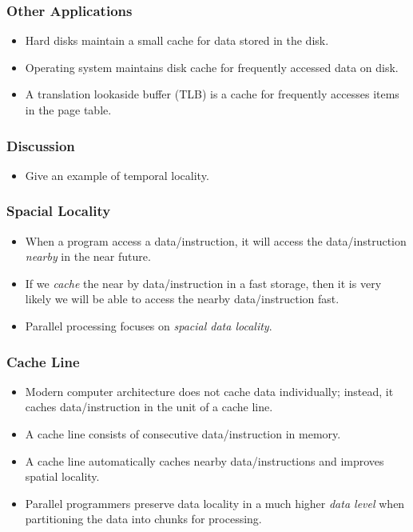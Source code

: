 \documentclass{beamer}
\begin{document}
\begin{CJK}{UTF8}{bsmi}
\begin{frame}
\frametitle{Other Applications}
\begin{itemize}
\item Hard disks maintain a small cache for data stored in the disk.
\item Operating system maintains disk cache for frequently accessed
  data on disk.
\item A translation lookaside buffer (TLB) is a cache for frequently
  accesses items in the page table.
\end{itemize}
\end{frame}

\begin{frame}
\frametitle{Discussion}
\begin{itemize}
\item Give an example of temporal locality.
\end{itemize}
\end{frame}

\begin{frame}
\frametitle{Spacial Locality}
\begin{itemize}
\item When a program access a data/instruction, it will access the
  data/instruction {\em nearby} in the near future.
\item If we {\em cache} the near by data/instruction in a fast
  storage, then it is very likely we will be able to access the nearby
  data/instruction fast.
\item Parallel processing focuses on {\em spacial data locality}.
\end{itemize}
\end{frame}

\begin{frame}
\frametitle{Cache Line}
\begin{itemize}
\item Modern computer architecture does not cache data individually; instead, it caches data/instruction in the unit of a cache line.
\item A cache line consists of consecutive data/instruction in memory.
\item A cache line automatically caches nearby data/instructions and improves spatial locality.
\item Parallel programmers preserve data locality in a much higher {\em data level} when partitioning the data into chunks for processing.
\end{itemize}
\end{frame}


\end{CJK}
\end{document}
